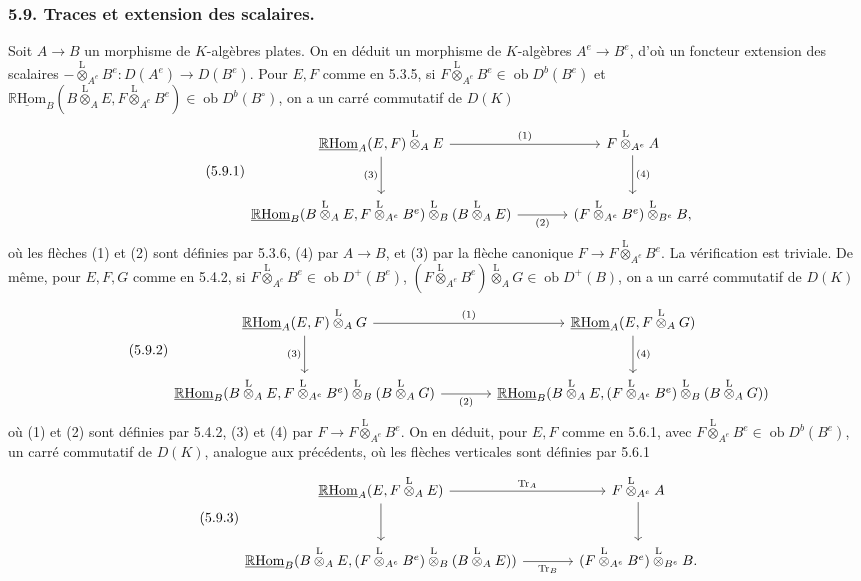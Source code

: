 \documentclass[11pt]{article}
\newcommand{\R}{\mathbb{R}}\newcommand{\RHomCore}{\mathbb{R}\mathrm{Hom}}
\newcommand{\ob}{\operatorname{ob}}
\providecommand{\RHom}{\RHomCore}
\providecommand{\uRHom}{\underline{\RHom}}
\providecommand{\Tr}{\operatorname{Tr}}
\providecommand{\Tr}{\operatorname{Tr}}
\providecommand{\lten}{\overset{\mathrm L}{\otimes}}
\providecommand{\Tr}{\operatorname{Tr}}
\providecommand{\RHom}{\RHomCore}
\providecommand{\ob}{\operatorname{ob}}
\providecommand{\lten}{\overset{\mathrm L}{\otimes}}
\providecommand{\RHom}{\R\mathcal{H}om}
\providecommand{\lten}{\overset{\mathrm L}{\otimes}}
\providecommand{\R}{\mathrm R}
\providecommand{\Tr}{\operatorname{Tr}}
\providecommand{\lten}{\overset{\mathrm L}{\otimes}}
\providecommand{\lten}{\overset{\mathrm L}{\otimes}}
\providecommand{\lten}{\overset{\mathrm L}{\otimes}}
\providecommand{\RHom}{\RHomCore}
\providecommand{\Tr}{\operatorname{Tr}}
\providecommand{\lten}{\overset{\mathrm L}{\otimes}}
\begin{document}
\subsubsection*{5.9. Traces et extension des scalaires.}

Soit $A\to B$ un morphisme de $K$-algèbres plates. On en déduit un morphisme de $K$-algèbres $A^e\to B^e$, d'où un foncteur extension des scalaires $-\lten_{A^e}B^e:D(A^e)\to D(B^e)$. Pour $E,F$ comme en 5.3.5, si $F\lten_{A^e}B^e\in\ob D^b(B^e)$ et $\uRHom_B(B\lten_AE,F\lten_{A^e}B^e)\in\ob D^b(B^\circ)$, on a un carré commutatif de $D(K)$
\begin{equation}\tag{5.9.1}
\begin{tikzcd}[column sep=large,row sep=large]
\uRHom_A(E,F)\lten_AE \arrow[r,"(1)"] \arrow[d,"(3)"'] & F\lten_{A^e}A \arrow[d,"(4)"]\\
\uRHom_B(B\lten_AE,F\lten_{A^e}B^e)\lten_B(B\lten_AE) \arrow[r,"(2)"'] & (F\lten_{A^e}B^e)\lten_{B^e}B,
\end{tikzcd}
\end{equation}
où les flèches (1) et (2) sont définies par 5.3.6, (4) par $A\to B$, et (3) par la flèche canonique $F\to F\lten_{A^e}B^e$. La vérification est triviale. De même, pour $E,F,G$ comme en 5.4.2, si $F\lten_{A^e}B^e\in\ob D^+(B^e)$, $(F\lten_{A^e}B^e)\lten_AG\in\ob D^+(B)$, on 
a un
carré commutatif de $D(K)$
\begin{equation}\tag{5.9.2}
\begin{tikzcd}[column sep=large,row sep=large]
\uRHom_A(E,F)\lten_AG \arrow[r,"(1)"] \arrow[d,"(3)"'] & \uRHom_A(E,F\lten_AG) \arrow[d,"(4)"]\\
\uRHom_B(B\lten_AE,F\lten_{A^e}B^e)\lten_B(B\lten_AG) \arrow[r,"(2)"'] & \uRHom_B(B\lten_AE,(F\lten_{A^e}B^e)\lten_B(B\lten_AG))
\end{tikzcd}
\end{equation}
où (1) et (2) sont définies par 5.4.2, (3) et (4) par $F\to F\lten_{A^e}B^e$. On en déduit, pour $E,F$ comme en 5.6.1, avec $F\lten_{A^e}B^e\in\ob D^b(B^e)$, un carré commutatif de $D(K)$, analogue aux précédents, où les flèches verticales sont définies par 5.6.1
\begin{equation}\tag{5.9.3}
\begin{tikzcd}[column sep=large,row sep=large]
\uRHom_A(E,F\lten_AE) \arrow[r,"\Tr_A"] \arrow[d] & F\lten_{A^e}A \arrow[d]\\
\uRHom_B(B\lten_AE,(F\lten_{A^e}B^e)\lten_B(B\lten_AE)) \arrow[r,"\Tr_B"'] & (F\lten_{A^e}B^e)\lten_{B^e}B.
\end{tikzcd}
\end{equation}
\end{document}
